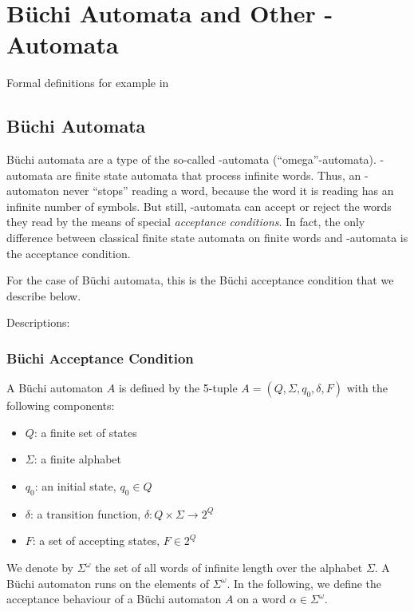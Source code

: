 \section{Büchi Automata and Other \om-Automata}

Formal definitions for example in~\cite{Thomas:1991}\cite{1996_thomas}\cite{2014_wilke}

\subsection{Büchi Automata}
\label{buchi_automata}
Büchi automata are a type of the so-called \om-automata (``omega''-automata). \om-automata are finite state automata that process infinite words. Thus, an \om-automaton never ``stops'' reading a word, because the word it is reading has an infinite number of symbols. But still, \om-automata can accept or reject the words they read by the means of special \textit{acceptance conditions}. In fact, the only difference between classical finite state automata on finite words and \om-automata is the acceptance condition. 

For the case of Büchi automata, this is the Büchi acceptance condition that we describe below.

Descriptions: \cite{Thomas:1991}\cite{2014_wilke}

\subsubsection{Büchi Acceptance Condition}

A Büchi automaton $A$ is defined by the 5-tuple $A = (Q, \Sigma, q_0, \delta, F)$ with the following components:
\begin{itemize}
\item $Q$: a finite set of states
\item $\Sigma$: a finite alphabet
\item $q_0$: an initial state, $q_0 \in Q$
\item $\delta$: a transition function, $\delta: Q \times \Sigma \rightarrow 2^Q$
\item $F$: a set of accepting states, $F \in 2^Q$
\end{itemize}

We denote by $\Sigma^\omega$ the set of all words of infinite length over the alphabet $\Sigma$. A Büchi automaton runs on the elements of $\Sigma^\omega$. In the following, we define the acceptance behaviour of a Büchi automaton $A$ on a word $\alpha \in \Sigma^\omega$.

